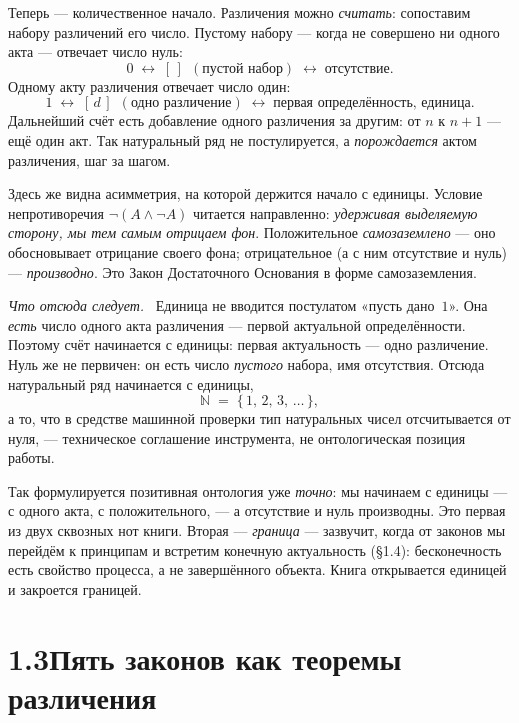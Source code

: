 \documentclass[12pt,a4paper]{article}
\newcommand{\rezultat}{\medskip\noindent\emph{Что отсюда следует.}\ }
\begin{document}
\medskip
Теперь --- количественное начало. Различения можно \emph{считать}: сопоставим набору
различений его число. Пустому набору --- когда не совершено ни одного акта --- отвечает
число нуль:
\[
  0 \;\longleftrightarrow\; [\,]\ \ (\text{пустой набор}) \;\longleftrightarrow\;
  \textbf{отсутствие.}
\]
Одному акту различения отвечает число один:
\[
  1 \;\longleftrightarrow\; [\,d\,]\ \ (\text{одно различение}) \;\longleftrightarrow\;
  \textbf{первая определённость, единица.}
\]
Дальнейший счёт есть добавление одного различения за другим: от $n$ к $n+1$ --- ещё
один акт. Так натуральный ряд не постулируется, а \emph{порождается} актом различения,
шаг за шагом.

Здесь же видна асимметрия, на которой держится начало с единицы. Условие непротиворечия
$\neg(A\wedge\neg A)$ читается направленно: \emph{удерживая выделяемую сторону, мы тем самым
отрицаем фон}. Положительное \emph{само\-заземлено} --- оно обосновывает отрицание своего
фона; отрицательное (а с ним отсутствие и нуль) --- \emph{производно}. Это Закон Достаточного
Основания в форме самозаземления.

\rezultat
Единица не вводится постулатом «пусть дано~$1$». Она \emph{есть} число одного акта
различения --- первой актуальной определённости. Поэтому счёт начинается с единицы:
первая актуальность --- одно различение. Нуль же не первичен: он есть число
\emph{пустого} набора, имя отсутствия. Отсюда натуральный ряд начинается с единицы,
\[
  \mathbb{N} \;=\; \{\,1,\,2,\,3,\,\dots\,\},
\]
а то, что в средстве машинной проверки тип натуральных чисел отсчитывается от нуля, ---
техническое соглашение инструмента, не онтологическая позиция работы.

Так формулируется позитивная онтология уже \emph{точно}: мы начинаем с единицы --- с
одного акта, с положительного, --- а отсутствие и нуль производны. Это первая из двух
сквозных нот книги. Вторая --- \emph{граница} --- зазвучит, когда от законов мы перейдём
к принципам и встретим конечную актуальность (§1.4): бесконечность есть свойство
процесса, а не завершённого объекта. Книга открывается единицей и закроется границей.

\section*{1.3\quad Пять законов как теоремы различения}
\end{document}
